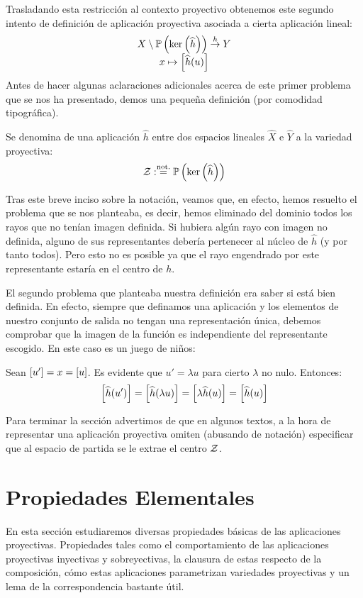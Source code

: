 Trasladando esta restricción al contexto proyectivo obtenemos este segundo intento de definición de aplicación proyectiva asociada a cierta aplicación lineal:
\[\begin{array}{c}
X\setminus\mathbb{P}\left(\ker\left(\widehat{h}\right)\right)\stackrel{h}{\to}Y\\
x\mapsto\left [ \widehat{h}(u) \right ]
\end{array}\]
Antes de hacer algunas aclaraciones adicionales acerca de este primer problema que se nos ha presentado, demos una pequeña definición (por comodidad tipográfica).
\begin{defi}[Centro]
	\label{C4_def_centro}
	Se denomina  de una aplicación $\widehat{h}$ entre dos espacios lineales $\widehat{X}$ e $\widehat{Y}$ a la variedad proyectiva:
	\[\mathcal{Z}:\stackrel{\textrm{not.}}{=}\mathbb{P}\left(\ker\left(\widehat{h}\right)\right)\]
\end{defi}
Tras este breve inciso sobre la notación, veamos que, en efecto, hemos resuelto el problema que se nos planteaba, es decir, hemos eliminado del dominio todos los rayos que no tenían imagen definida. Si hubiera algún rayo con imagen no definida, alguno de sus representantes debería pertenecer al núcleo de $\widehat{h}$ (y por tanto todos). Pero esto no es posible ya que el rayo engendrado por este representante estaría en el centro de $h$.

El segundo problema que planteaba nuestra definición era saber si está bien definida. En efecto, siempre que definamos una aplicación y los elementos de nuestro conjunto de salida no tengan una representación única, debemos comprobar que la imagen de la función es independiente del representante escogido. En este caso es un juego de niños:

Sean $\left [ u' \right ]=x=\left [ u \right ]$. Es evidente que $u' = \lambda u$ para cierto $\lambda$ no nulo. Entonces:
\[\left [ \widehat{h}(u') \right ]=\left [ \widehat{h}(\lambda u) \right ]=\left [ \lambda\widehat{h}(u) \right ]=\left [ \widehat{h}(u) \right ]\]

Para terminar la sección advertimos de que en algunos textos, a la hora de representar una aplicación proyectiva omiten (abusando de notación) especificar que al espacio de partida se le extrae el centro $\mathcal{Z}$. 
\section{Propiedades Elementales}
En esta sección estudiaremos diversas propiedades básicas de las aplicaciones proyectivas. Propiedades tales como el comportamiento de las aplicaciones proyectivas inyectivas y sobreyectivas, la clausura de estas respecto de la composición, cómo estas aplicaciones parametrizan variedades proyectivas y un lema de la correspondencia bastante útil.

